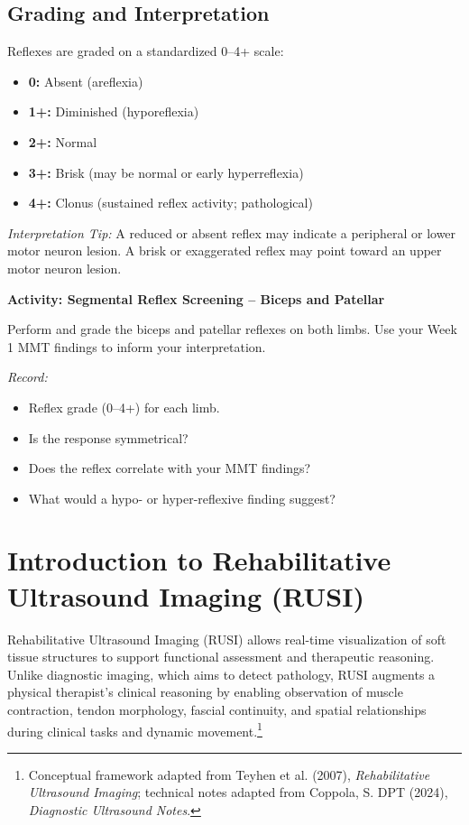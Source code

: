 \subsection*{Grading and Interpretation}

Reflexes are graded on a standardized 0–4+ scale:

\begin{itemize}
  \item \textbf{0:} Absent (areflexia)
  \item \textbf{1+:} Diminished (hyporeflexia)
  \item \textbf{2+:} Normal
  \item \textbf{3+:} Brisk (may be normal or early hyperreflexia)
  \item \textbf{4+:} Clonus (sustained reflex activity; pathological)
\end{itemize}

\textit{Interpretation Tip:} A reduced or absent reflex may indicate a peripheral or lower motor neuron lesion. A brisk or exaggerated reflex may point toward an upper motor neuron lesion.

\begin{labactivitybox}
\textbf{Activity: Segmental Reflex Screening – Biceps and Patellar}

Perform and grade the biceps and patellar reflexes on both limbs. Use your Week 1 MMT findings to inform your interpretation.

\textit{Record:}
\begin{itemize}
  \item Reflex grade (0–4+) for each limb.
  \item Is the response symmetrical?
  \item Does the reflex correlate with your MMT findings?
  \item What would a hypo- or hyper-reflexive finding suggest?
\end{itemize}
\end{labactivitybox}

\section*{Introduction to Rehabilitative Ultrasound Imaging (RUSI)}

Rehabilitative Ultrasound Imaging (RUSI) allows real-time visualization of soft tissue structures to support functional assessment and therapeutic reasoning. Unlike diagnostic imaging, which aims to detect pathology, RUSI augments a physical therapist’s clinical reasoning by enabling observation of muscle contraction, tendon morphology, fascial continuity, and spatial relationships during clinical tasks and dynamic movement.\footnote{Conceptual framework adapted from Teyhen et al. (2007), \textit{Rehabilitative Ultrasound Imaging}; technical notes adapted from Coppola, S. DPT (2024), \textit{Diagnostic Ultrasound Notes}.}

